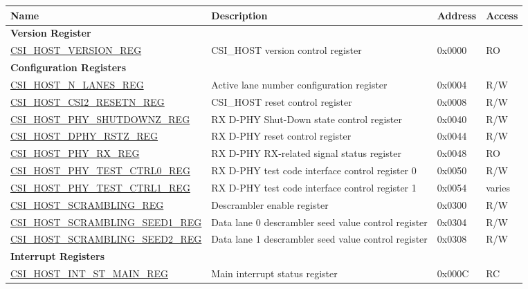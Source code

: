 \begin{longtable}{ | p{9cm} | p{10cm} | p{1.3cm} | p{1.2cm} | }
\hline\rowcolor{lightgray}
\textbf{Name} & \textbf{Description} &  \textbf{Address} & \textbf{Access} \\ \hline
\endhead
\multicolumn{4}{|l|}{\textbf{Version Register}} \\ \hline
\hyperref[regdesc:CSIHOSTVERSIONREG]{CSI\_HOST\_VERSION\_REG} & CSI\_HOST version control register & 0x0000 & RO \\ \hline
\multicolumn{4}{|l|}{\textbf{Configuration Registers}} \\ \hline
\hyperref[regdesc:CSIHOSTNLANESREG]{CSI\_HOST\_N\_LANES\_REG} & Active lane number configuration register& 0x0004 & R/W \\ \hline
\hyperref[regdesc:CSIHOSTCSI2RESETNREG]{CSI\_HOST\_CSI2\_RESETN\_REG} & CSI\_HOST reset control register & 0x0008 & R/W \\ \hline
\hyperref[regdesc:CSIHOSTPHYSHUTDOWNZREG]{CSI\_HOST\_PHY\_SHUTDOWNZ\_REG} & RX D-PHY Shut-Down state control register & 0x0040 & R/W \\ \hline
\hyperref[regdesc:CSIHOSTDPHYRSTZREG]{CSI\_HOST\_DPHY\_RSTZ\_REG} & RX D-PHY reset control register & 0x0044 & R/W \\ \hline
\hyperref[regdesc:CSIHOSTPHYRXREG]{CSI\_HOST\_PHY\_RX\_REG} & RX D-PHY RX-related signal status register & 0x0048 & RO \\ \hline
\hyperref[regdesc:CSIHOSTPHYTESTCTRL0REG]{CSI\_HOST\_PHY\_TEST\_CTRL0\_REG} & RX D-PHY test code interface control register 0 & 0x0050 & R/W \\ \hline
\hyperref[regdesc:CSIHOSTPHYTESTCTRL1REG]{CSI\_HOST\_PHY\_TEST\_CTRL1\_REG} & RX D-PHY test code interface control register 1 & 0x0054 & varies \\ \hline
\hyperref[regdesc:CSIHOSTSCRAMBLINGREG]{CSI\_HOST\_SCRAMBLING\_REG} & Descrambler enable register & 0x0300 & R/W \\ \hline
\hyperref[regdesc:CSIHOSTSCRAMBLINGSEED1REG]{CSI\_HOST\_SCRAMBLING\_SEED1\_REG} & Data lane 0 descrambler seed value control register & 0x0304 & R/W \\ \hline
\hyperref[regdesc:CSIHOSTSCRAMBLINGSEED2REG]{CSI\_HOST\_SCRAMBLING\_SEED2\_REG} & Data lane 1 descrambler seed value control register & 0x0308 & R/W \\ \hline
\multicolumn{4}{|l|}{\textbf{Interrupt Registers}} \\ \hline
\hyperref[regdesc:CSIHOSTINTSTMAINREG]{CSI\_HOST\_INT\_ST\_MAIN\_REG} & Main interrupt status register & 0x000C & RC \\ \hline

\end{longtable}
